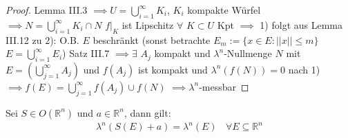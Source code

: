 \documentclass[11pt,a4paper,fleqn,openany]{report}
\begin{document}
    \begin{proof}
      Lemma III.3 $\implies U = \bigcup\limits_{i=1}^{\infty}K_i$, $K_i$ kompakte Würfel \newline
      $\implies N = \bigcup\limits_{i=1}^{\infty}K_i\cap N$ \newline
      $f|_K$ ist Lipschitz $\forall$ $K\subset U$ Kpt \newline
      $\implies$ 1) folgt aus Lemma III.12 \newline
      zu 2): O.B. $E$ beschränkt (sonst betrachte $E_m := \{x\in E: ||x||\leq m \}$ $E = \bigcup\limits_{i=1}^{\infty}E_i$)  \newline
      Satz III.7 $\implies \exists$ $A_j$ kompakt und $\lambda^n$-Nullmenge $N$ mit $E=(\bigcup\limits_{j=1}^{\infty}A_j)$ und $f(A_j)$ ist kompakt und $\lambda^n(f(N)) = 0$ nach 1) \newline
      $\implies f(E) = \bigcup\limits_{j=1}^{\infty}f(A_j) \cup f(N)$ $\implies \lambda^n$-messbar
    \end{proof}

    \begin{theorem}
      Sei $S \in O(\mathbb{R}^n)$ und $a \in \mathbb{R}^n$, dann gilt:
      \begin{align*}
        \lambda^n(S(E) + a) = \lambda^n(E) \ \ \ \ \forall E \subseteq \mathbb{R}^n
      \end{align*}
    \end{theorem}
\end{document}
